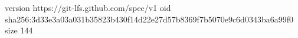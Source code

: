 version https://git-lfs.github.com/spec/v1
oid sha256:3d33e3a03a031b35823b430f14d22e27d57b8369f7b5070e9c6d0343ba6a99f0
size 144
